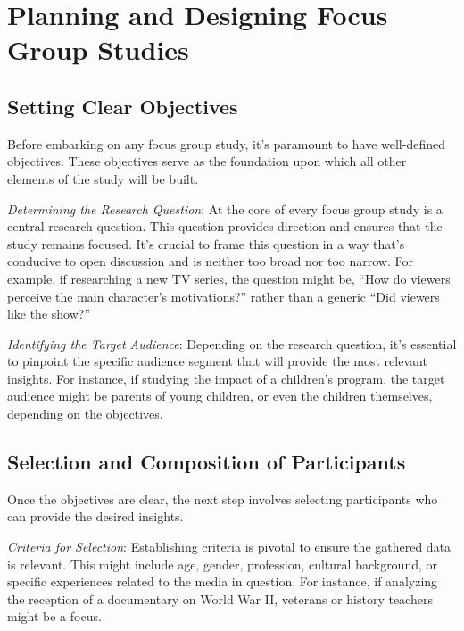 \documentclass[
  b5paper]{book}
\begin{document}
\hypertarget{planning-and-designing-focus-group-studies}{%
\section{Planning and Designing Focus Group Studies}\label{planning-and-designing-focus-group-studies}}

\hypertarget{setting-clear-objectives}{%
\subsection*{Setting Clear Objectives}\label{setting-clear-objectives}}

Before embarking on any focus group study, it's paramount to have well-defined objectives. These objectives serve as the foundation upon which all other elements of the study will be built.

\emph{Determining the Research Question}: At the core of every focus group study is a central research question. This question provides direction and ensures that the study remains focused. It's crucial to frame this question in a way that's conducive to open discussion and is neither too broad nor too narrow. For example, if researching a new TV series, the question might be, ``How do viewers perceive the main character's motivations?'' rather than a generic ``Did viewers like the show?''

\emph{Identifying the Target Audience}: Depending on the research question, it's essential to pinpoint the specific audience segment that will provide the most relevant insights. For instance, if studying the impact of a children's program, the target audience might be parents of young children, or even the children themselves, depending on the objectives.

\hypertarget{selection-and-composition-of-participants}{%
\subsection*{Selection and Composition of Participants}\label{selection-and-composition-of-participants}}

Once the objectives are clear, the next step involves selecting participants who can provide the desired insights.

\emph{Criteria for Selection}: Establishing criteria is pivotal to ensure the gathered data is relevant. This might include age, gender, profession, cultural background, or specific experiences related to the media in question. For instance, if analyzing the reception of a documentary on World War II, veterans or history teachers might be a focus.
\end{document}
